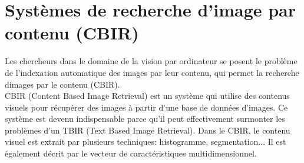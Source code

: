 
\section{Systèmes de recherche d'image par contenu (CBIR)}
Les chercheurs dans le domaine de la vision par ordinateur se posent le problème de l'indexation automatique des images par leur contenu, qui permet la recherche dimages par le
contenu (CBIR).\\

CBIR (Content Based Image Retrieval) est un système qui utilise des contenus visuels pour récupérer des images à partir d'une base de données d'images. Ce système est devenu indispensable parce qu'il peut effectivement surmonter les problèmes d'un TBIR (Text Based Image Retrieval). Dans le CBIR, le contenu visuel est extrait par plusieurs techniques:
histogramme, segmentation... Il est également décrit par le vecteur de caractéristiques multidimensionnel. 


